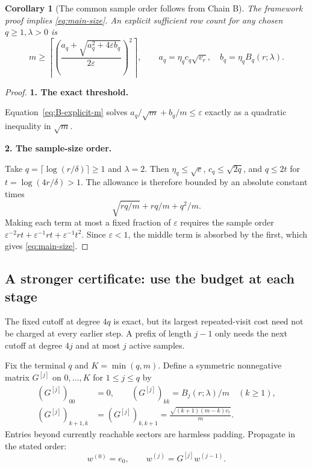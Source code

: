 \documentclass[11pt]{article}
\numberwithin{equation}{section}
\newtheorem{corollary}[theorem]{Corollary}
\theoremstyle{definition}\newtheorem{definition}[theorem]{Definition}
\theoremstyle{remark}\newtheorem{remark}[theorem]{Remark}
\newcommand{\step}[1]{\par\addvspace{.65\baselineskip}\Needspace{4\baselineskip}\noindent\textbf{#1}\par\nobreak\smallskip}
\begin{document}
\begin{corollary}[The common sample order follows from Chain B]\label{cor:B-size}
The framework proof implies \eqref{eq:main-size}. An explicit sufficient row
count for any chosen $q\ge1,\lambda>0$ is
\begin{equation}\label{eq:B-explicit-m}
 m\ge\left\lceil\left(
 \frac{a_q+\sqrt{a_q^2+4\varepsilon b_q}}{2\varepsilon}
 \right)^2\right\rceil,
 \qquad
 a_q=\eta_qc_q\sqrt{v_r},\quad b_q=\eta_qB_q(r;\lambda).
\end{equation}
\end{corollary}
\begin{proof}
\step{1. The exact threshold.}
Equation~\eqref{eq:B-explicit-m} solves
$a_q/\sqrt m+b_q/m\le\varepsilon$ exactly as a quadratic inequality in
$\sqrt m$.

\step{2. The sample-size order.}
Take $q=\lceil\log(r/\delta)\rceil\ge1$ and $\lambda=2$.
Then $\eta_q\le\sqrt e$, $c_q\le\sqrt{2q}$, and $q\le2t$ for
$t=\log(4r/\delta)>1$.
The allowance is therefore bounded by an absolute constant times
\[
 \sqrt{rq/m}+rq/m+q^2/m.
\]
Making each term at most a fixed fraction of $\varepsilon$ requires the sample
order
$\varepsilon^{-2}rt+\varepsilon^{-1}rt+\varepsilon^{-1}t^2$.
Since $\varepsilon<1$, the middle term is absorbed by the first, which gives
\eqref{eq:main-size}.
\end{proof}

\subsection{A stronger certificate: use the budget at each stage}\label{sec:stagewise}
The fixed cutoff at degree $4q$ is exact, but its largest repeated-visit cost need
not be charged at every earlier step. A prefix of length $j-1$ only needs the next
cutoff at degree $4j$ and at most $j$ active samples.

Fix the terminal $q$ and $K=\min(q,m)$. Define a symmetric nonnegative matrix
$G^{[j]}$ on $0,\ldots,K$ for $1\le j\le q$ by
\begin{align}
 (G^{[j]})_{00}&=0,\qquad (G^{[j]})_{kk}=B_j(r;\lambda)/m\quad(k\ge1),\nonumber\\
 (G^{[j]})_{k+1,k}&=(G^{[j]})_{k,k+1}
 =\frac{\sqrt{(k+1)(m-k)v_r}}m.
 \label{eq:stage-matrix}
\end{align}
Entries beyond currently reachable sectors are harmless padding.
Propagate in the stated order:
\begin{equation}\label{eq:ordered-propagation}
 w^{(0)}=e_0,\qquad w^{(j)}=G^{[j]}w^{(j-1)}.
\end{equation}
\end{document}
